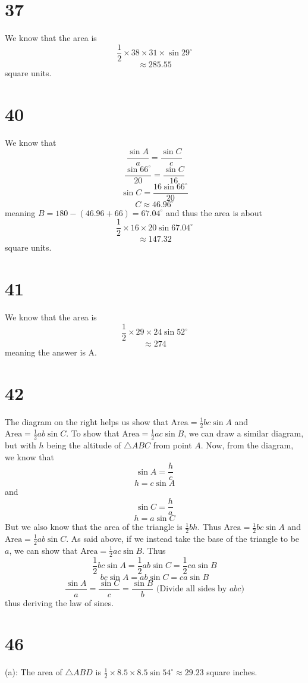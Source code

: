 \documentclass{article}
\theoremstyle{definition}
\newcommand{\?}{\stackrel{?}{=}}
\begin{document}
\section*{37}
We know that the area is
\[ \frac{1}{2}\times 38\times 31\times\sin 29^\circ \]
\[ \approx 285.55 \] square units.

\section*{40}
We know that
\[ \frac{\sin A}{a}=\frac{\sin C}{c} \]
\[ \frac{\sin 66^\circ}{20}=\frac{\sin C}{16} \]
\[ \sin C=\frac{16\sin 66^\circ}{20} \]
\[ C\approx 46.96^\circ \]
meaning $B=180-(46.96+66)=67.04^\circ$ and thus the area is about
\[ \frac{1}{2}\times 16\times 20\sin 67.04^\circ \]
\[ \approx 147.32 \] square units.

\section*{41}
We know that the area is
\[ \frac{1}{2}\times 29\times 24\sin 52^\circ \]
\[ \approx 274 \] meaning the answer is A.

\section*{42}
The diagram on the right helps us show that $\textrm{Area}=\frac{1}{2}bc\sin A$ and $\textrm{Area}=\frac{1}{2}ab\sin C$. To show that
$\textrm{Area}=\frac{1}{2}ac\sin B$, we can draw a similar diagram, but with $h$ being the altitude of $\triangle ABC$ from point $A$. Now, from the diagram, we know that
\[ \sin A=\frac{h}{c} \]
\[ h=c\sin A \] and \[ \sin C=\frac{h}{a} \] \[ h=a\sin C \] But we also know that
the area of the triangle is $\frac{1}{2}bh$. Thus $\textrm{Area}=\frac{1}{2}bc\sin A$ and $\textrm{Area}=\frac{1}{2}ab\sin C$. As said above, if we instead take the base of the triangle to 
be $a$, we can show that $\textrm{Area}=\frac{1}{2}ac\sin B$. Thus
\[ \frac{1}{2}bc\sin A=\frac{1}{2}ab\sin C=\frac{1}{2}ca\sin B \]
\[ bc\sin A=ab\sin C=ca\sin B \]
\[ \frac{\sin A}{a}=\frac{\sin C}{c}=\frac{\sin B}{b}\textrm{ (Divide all sides by $abc$)} \] 
thus deriving the law of sines.

\section*{46}
(a): The area of $\triangle ABD$ is $\frac{1}{2}\times 8.5\times 8.5\sin 54^\circ\approx 29.23$ square inches.
\end{document}
